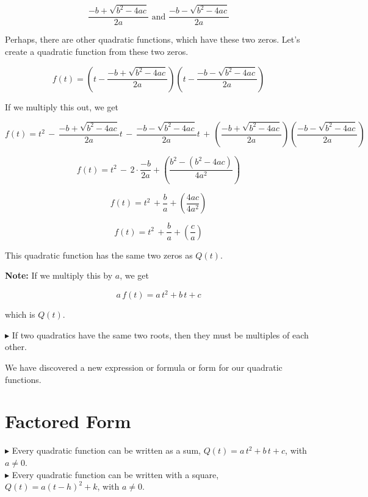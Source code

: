 \documentclass{ximera}
\begin{document}
\[   \frac{-b + \sqrt{b^2 - 4 a c}}{2a}     \text{ and }    \frac{-b - \sqrt{b^2 - 4 a c}}{2a}   \]



Perhaps, there are other quadratic functions, which have these two zeros. Let's create a quadratic function from these two zeros.



\[ f(t) =  \left(t - \frac{-b + \sqrt{b^2 - 4 a c}}{2a}\right)   \left(t -  \frac{-b - \sqrt{b^2 - 4 a c}}{2a}\right)   \]


If we multiply this out, we get



\[ f(t) =   t^2 \, - \, \frac{-b + \sqrt{b^2 - 4 a c}}{2a} t \, - \, \frac{-b - \sqrt{b^2 - 4 a c}}{2a}  t \, + \, \left(\frac{-b + \sqrt{b^2 - 4 a c}}{2a}\right) \left(\frac{-b - \sqrt{b^2 - 4 a c}}{2a}\right) \]


\[ f(t) = t^2  \, - \, 2 \cdot \frac{-b}{2a} + \left(    \frac{b^2 - (b^2 - 4 a c)}{4 a^2}     \right)        \]


\[ f(t) = t^2  \, + \frac{b}{a} + \left(    \frac{4 a c}{4 a^2}     \right)        \]

\[ f(t) = t^2  \, +  \frac{b}{a} + \left(    \frac{c}{a}     \right)        \]


This quadratic function has the same two zeros as $Q(t)$.  


\textbf{Note:} If we multiply this by $a$, we get 


\[ a \, f(t) = a \, t^2 + b \, t + c \]

which is $Q(t)$.


$\blacktriangleright$ If two quadratics have the same two roots, then they must be multiples of each other.






We have discovered a new expression or formula or form for our quadratic functions.



\section{Factored Form}

$\blacktriangleright$ Every quadratic function can be written as a sum, $Q(t) = a \, t^2 + b \, t + c$, with $a \ne 0$. \\



$\blacktriangleright$ Every quadratic function can be written with a square, $Q(t) = a (t - h)^2 + k$, with $a \ne 0$. \\
\end{document}
